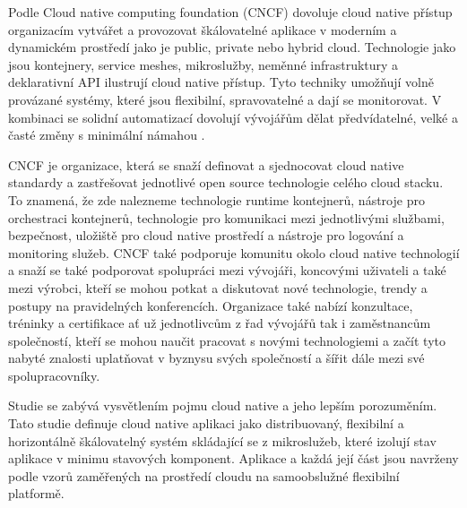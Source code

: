         Podle Cloud native computing foundation (CNCF) dovoluje cloud native přístup organizacím vytvářet a provozovat škálovatelné aplikace v moderním a dynamickém prostředí jako je public, private nebo hybrid cloud. Technologie jako jsou \linebreak kontejnery, service meshes, mikroslužby, neměnné infrastruktury a deklarativní API ilustrují cloud native přístup. Tyto techniky umožňují volně provázané systémy, které jsou flexibilní, spravovatelné a dají se monitorovat. V kombinaci se solidní automatizací dovolují vývojářům dělat předvídatelné, velké a časté změny s minimální námahou \cite{CNCFdefinition}. \par
	CNCF je organizace, která se snaží definovat a sjednocovat cloud native standardy a zastřešovat jednotlivé open source technologie celého cloud stacku. To znamená, že zde nalezneme technologie runtime kontejnerů, nástroje pro orchestraci kontejnerů, technologie pro komunikaci mezi jednotlivými službami, bezpečnost, uložiště pro cloud native prostředí a nástroje pro logování a monitoring služeb. CNCF také podporuje komunitu okolo cloud native technologií a snaží se také podporovat spolupráci mezi vývojáři, koncovými uživateli a také mezi výrobci, kteří se mohou potkat a diskutovat nové technologie, trendy a postupy na pravidelných konferencích. Organizace také nabízí konzultace, tréninky a certifikace ať už jednotlivcům z řad vývojářů tak i zaměstnancům společností, kteří se mohou naučit pracovat s novými technologiemi a začít tyto nabyté znalosti uplatňovat v byznysu svých společností a šířit dále mezi své spolupracovníky. \par
	    Studie \cite{KRATZKE} se zabývá vysvětlením pojmu cloud native a jeho lepším porozuměním. Tato studie definuje cloud native aplikaci jako distribuovaný, flexibilní a horizontálně škálovatelný systém skládající se z mikroslužeb, které izolují stav aplikace v minimu stavových komponent. Aplikace a každá její část jsou navrženy podle vzorů zaměřených na prostředí cloudu na samoobslužné flexibilní platformě. \par
	        
